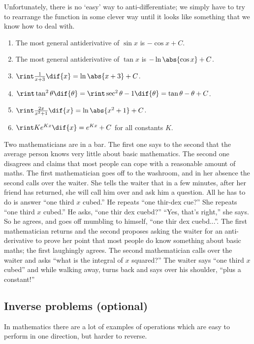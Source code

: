 Unfortunately, there is no `easy' way to anti-differentiate; we simply have to try to rearrange the function in some clever
way until it looks like something that we know how to deal with.

\begin{exs}\leavevmode
  \begin{enumerate}
    \item The most general antiderivative of $ \sin x $ is $ -\cos x + C $.
    \item The most general antiderivative of $ \tan x $ is $ -\ln \abs{\cos x} + C $.
    \item $ \rint \frac{1}{x + 3} \dif{x} = \ln \abs{x + 3} + C $.
    \item $ \rint \tan^2 \theta \dif{\theta} = \rint \sec^2 \theta - 1 \dif{\theta} = \tan \theta - \theta + C $.
    \item $ \rint \frac{2x}{x^2 + 1} \dif{x} = \ln \abs{x^2 + 1} + C $.
    \item $ \rint Ke^{Kx} \dif{x} = e^{Kx} + C $ for all constants $ K $.
  \end{enumerate}
\end{exs}

\begin{joke}
  Two mathematicians are in a bar. The first one says to the second that the average person knows very little about basic
  mathematics. The second one disagrees and claims that most people can cope with a reasonable amount of maths. The first
  mathematician goes off to the washroom, and in her absence the second calls over the waiter. She tells the waiter that in a few
  minutes, after her friend has returned, she will call him over and ask him a question. All he has to do is answer ``one
  third $x$ cubed.'' He repeats ``one thir-dex cue?'' She repeats ``one third $x$ cubed.'' He asks, ``one thir dex cuebd?'' ``Yes,
  that’s right,'' she says. So he agrees, and goes off mumbling to himself, ``one thir dex cuebd...''. The first mathematician returns
  and the second proposes asking the waiter for an anti-derivative to prove her point that most people do know something about basic maths;
  the first laughingly agrees. The second mathematician calls over the waiter and asks ``what is the integral of $x$ squared?'' The waiter
  says ``one third $x$ cubed'' and while walking away, turns back and says over his shoulder, ``plus a constant!''
\end{joke}

\subsection{Inverse problems (optional)}
In mathematics there are a lot of examples of operations which are easy to perform
in one direction, but harder to reverse.

